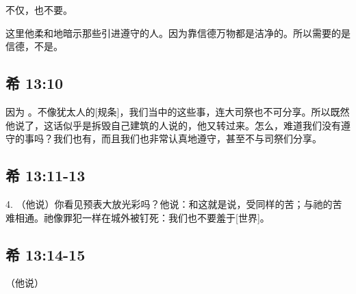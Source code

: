 不仅，也不要。\par

这里他柔和地暗示那些引进遵守的人。因为靠信德万物都是洁净的。所以需要的是信德，不是。\par


\subsection{希 13:10}

因为 。不像犹太人的[规条]，我们当中的这些事，连大司祭也不可分享。所以既然他说了，这话似乎是拆毁自己建筑的人说的，他又转过来。怎么，难道我们没有遵守的事吗？我们也有，而且我们也非常认真地遵守，甚至不与司祭们分享。\par


\subsection{希 13:11-13}

4. （他说）你看见预表大放光彩吗？他说：和这就是说，受同样的苦；与祂的苦难相通。祂像罪犯一样在城外被钉死：我们也不要羞于[世界]。\par


\subsection{希 13:14-15}

（他说）\par

